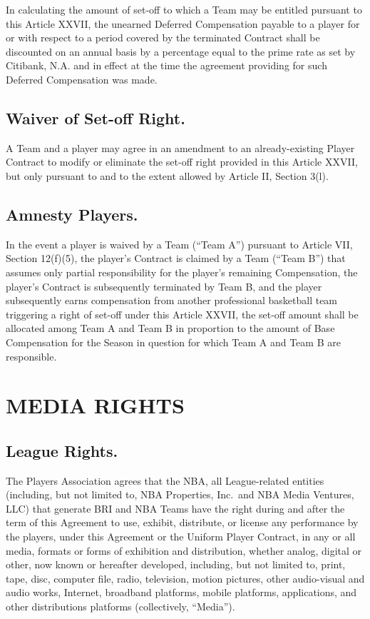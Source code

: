\documentclass[
]{book}
\begin{document}
In calculating the amount of set-off to which a Team may be entitled pursuant to this Article XXVII, the unearned Deferred Compensation payable to a player for or with respect to a period covered by the terminated Contract shall be discounted on an annual basis by a percentage equal to the prime rate as set by Citibank, N.A. and in effect at the time the agreement providing for such Deferred Compensation was made.

\hypertarget{waiver-of-set-off-right.}{%
\section{Waiver of Set-off Right.}\label{waiver-of-set-off-right.}}

A Team and a player may agree in an amendment to an already-existing Player Contract to modify or eliminate the set-off right provided in this Article XXVII, but only pursuant to and to the extent allowed by Article II, Section 3(l).

\hypertarget{amnesty-players.}{%
\section{Amnesty Players.}\label{amnesty-players.}}

In the event a player is waived by a Team (``Team A'') pursuant to Article VII, Section 12(f)(5), the player's Contract is claimed by a Team (``Team B'') that assumes only partial responsibility for the player's remaining Compensation, the player's Contract is subsequently terminated by Team B, and the player subsequently earns compensation from another professional basketball team triggering a right of set-off under this Article XXVII, the set-off amount shall be allocated among Team A and Team B in proportion to the amount of Base Compensation for the Season in question for which Team A and Team B are responsible.

\hypertarget{media-rights}{%
\chapter{MEDIA RIGHTS}\label{media-rights}}

\hypertarget{league-rights.}{%
\section{League Rights.}\label{league-rights.}}

The Players Association agrees that the NBA, all League-related entities (including, but not limited to, NBA Properties, Inc.~and NBA Media Ventures, LLC) that generate BRI and NBA Teams have the right during and after the term of this Agreement to use, exhibit, distribute, or license any performance by the players, under this Agreement or the Uniform Player Contract, in any or all media, formats or forms of exhibition and distribution, whether analog, digital or other, now known or hereafter developed, including, but not limited to, print, tape, disc, computer file, radio, television, motion pictures, other audio-visual and audio works, Internet, broadband platforms, mobile platforms, applications, and other distributions platforms (collectively, ``Media'').
\end{document}
